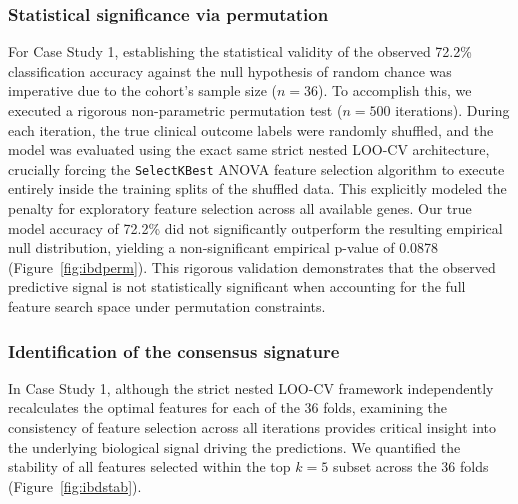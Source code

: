 \documentclass{bmcart}
\begin{document}
\subsubsection*{Statistical significance via permutation}
For Case Study 1, establishing the statistical validity of the observed 72.2\% classification accuracy against the null hypothesis of random chance was imperative due to the cohort's sample size ($n=36$). To accomplish this, we executed a rigorous non-parametric permutation test ($n=500$ iterations). During each iteration, the true clinical outcome labels were randomly shuffled, and the model was evaluated using the exact same strict nested LOO-CV architecture, crucially forcing the \texttt{SelectKBest} ANOVA feature selection algorithm to execute entirely inside the training splits of the shuffled data. This explicitly modeled the penalty for exploratory feature selection across all available genes. Our true model accuracy of 72.2\% did not significantly outperform the resulting empirical null distribution, yielding a non-significant empirical p-value of 0.0878 (Figure~\ref{fig:ibdperm}). This rigorous validation demonstrates that the observed predictive signal is not statistically significant when accounting for the full feature search space under permutation constraints.

\subsubsection*{Identification of the consensus signature}
In Case Study 1, although the strict nested LOO-CV framework independently recalculates the optimal features for each of the 36 folds, examining the consistency of feature selection across all iterations provides critical insight into the underlying biological signal driving the predictions. We quantified the stability of all features selected within the top $k=5$ subset across the 36 folds (Figure~\ref{fig:ibdstab}).
\end{document}
